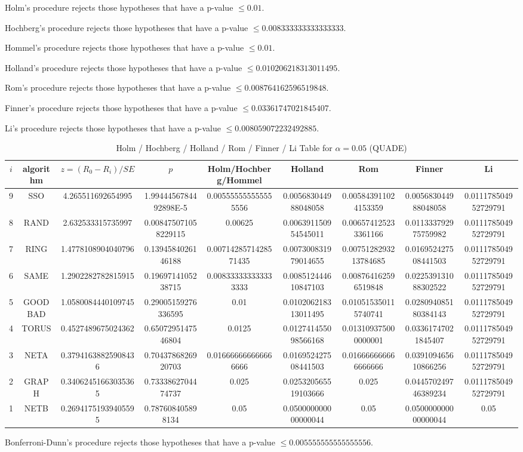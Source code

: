 \documentclass[a4paper,10pt]{article}
\begin{document}
\begin{landscape}
Holm's procedure rejects those hypotheses that have a p-value $\le0.01$.


Hochberg's procedure rejects those hypotheses that have a p-value $\le0.008333333333333333$.


Hommel's procedure rejects those hypotheses that have a p-value $\le0.01$.


Holland's procedure rejects those hypotheses that have a p-value $\le0.010206218313011495$.


Rom's procedure rejects those hypotheses that have a p-value $\le0.008764162596519848$.


Finner's procedure rejects those hypotheses that have a p-value $\le0.03361747021845407$.


Li's procedure rejects those hypotheses that have a p-value $\le0.008059072232492885$.



\newpage

\begin{table}[!htp]
\centering\scriptsize
\caption{Holm / Hochberg / Holland / Rom / Finner / Li Table for $\alpha=0.05$ (QUADE)}
\begin{tabular}{ccccccccc}
$i$&algorithm&$z=(R_0 - R_i)/SE$&$p$&Holm/Hochberg/Hommel&Holland&Rom&Finner&Li\\
\hline
9& SSO&4.265511692654995&1.9944456784492898E-5&0.005555555555555556&0.005683044988048058&0.005843911024153359&0.005683044988048058&0.011178504952729791\\
8& RAND&2.632533315735997&0.008475071058229115&0.00625&0.006391150954545011&0.006574125233361166&0.011333792975759982&0.011178504952729791\\
7& RING&1.4778108904040796&0.1394584026146188&0.0071428571428571435&0.007300831979014655&0.0075128293213784685&0.016952427508441503&0.011178504952729791\\
6& SAME&1.2902282782815915&0.1969714105238715&0.008333333333333333&0.008512444610847103&0.008764162596519848&0.022539131088302522&0.011178504952729791\\
5& GOODBAD&1.0580084440109745&0.29005159276336595&0.01&0.010206218313011495&0.010515350115740741&0.028094085180384143&0.011178504952729791\\
4& TORUS&0.4527489675024362&0.6507295147546804&0.0125&0.012741455098566168&0.013109375000000001&0.03361747021845407&0.011178504952729791\\
3& NETA&0.37941638825908436&0.7043786826920703&0.016666666666666666&0.016952427508441503&0.016666666666666666&0.039109465610866256&0.011178504952729791\\
2& GRAPH&0.34062451663035365&0.7333862704474737&0.025&0.025320565519103666&0.025&0.044570249746389234&0.011178504952729791\\
1& NETB&0.26941751939405595&0.787608405898134&0.05&0.050000000000000044&0.05&0.050000000000000044&0.05\\
\hline
\end{tabular}
\end{table}
Bonferroni-Dunn's procedure rejects those hypotheses that have a p-value $\le0.005555555555555556$.



\end{landscape}
\end{document}
